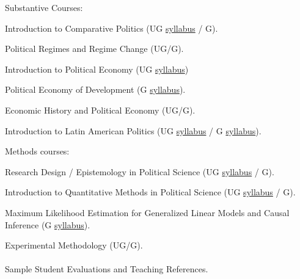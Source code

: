 \documentclass[letterpaper]{article}
\renewenvironment{itemize}{
  \begin{list}{}{
    \setlength{\leftmargin}{1.5em}
  }
}{
  \end{list}
}
\begin{document}
\begin{itemize}
\item Substantive Courses:
	\begin{itemize}
	\item Introduction to Comparative Politics (UG \href{https://github.com/hbahamonde/Comparative_Politics_UGRAD/raw/master/Bahamonde_Comparative_Politics_Syllabus_UGRAD.pdf}{syllabus} / G).
	\item Political Regimes and Regime Change (UG/G).
	\item Introduction to Political Economy (UG \href{https://github.com/hbahamonde/Political-Economy-Intro-UGrad/raw/master/Pol_Econ_Dev_Syllabus_UGRAD.pdf}{syllabus})
	\item Political Economy of Development (G \href{https://github.com/hbahamonde/Pol_Econ_Dev_Grad/raw/master/Pol_Econ_Dev_Syllabus_GRAD.pdf}{syllabus}).
	\item Economic History and Political Economy (UG/G).
	\item Introduction to Latin American Politics (UG \href{https://github.com/hbahamonde/Latin_American_Politics_UGRAD/raw/master/Bahamonde_Latin_American_Politics_Syllabus_UGRAD.pdf}{syllabus} / G \href{https://github.com/hbahamonde/Latin_American_Politics_GRAD/raw/master/Bahamonde_Latin_American_Politics_Syllabus_GRAD.pdf}{syllabus}).
	\end{itemize}
\item Methods courses:
	\begin{itemize}
	\item Research Design / Epistemology in Political Science (UG \href{https://github.com/hbahamonde/Social_Sciences_Epistemology_UGRAD/raw/master/Bahamonde_Social_Sciences_Epistemology_UGRAD_Syllabus.pdf}{syllabus} / G).
	\item Introduction to Quantitative Methods in Political Science (UG \href{https://github.com/hbahamonde/OLS/raw/master/Bahamonde_OLS.pdf}{syllabus} / G).
	\item Maximum Likelihood Estimation for Generalized Linear Models and Causal Inference (G \href{https://github.com/hbahamonde/MLE/raw/master/Bahamonde_MLE.pdf}{syllabus}).
	\item Experimental Methodology (UG/G).
	\end{itemize}
\end{itemize}


\newpage
\paragraph{}{Sample Student Evaluations and Teaching References}. 
\end{document}
